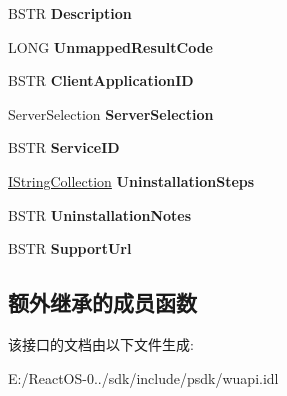 \begin{DoxyCompactItemize}
B\+S\+TR {\bfseries Description}
\item 
\mbox{\label{interface_w_u_api_lib_1_1_i_update_history_entry_af2b8fa931f60a9585f155c8e0131710d}} 
L\+O\+NG {\bfseries Unmapped\+Result\+Code}
\item 
\mbox{\label{interface_w_u_api_lib_1_1_i_update_history_entry_ab0ea8d94e8055c49b1fceab1669e60be}} 
B\+S\+TR {\bfseries Client\+Application\+ID}
\item 
\mbox{\label{interface_w_u_api_lib_1_1_i_update_history_entry_ad94595ec49f5157e1f8f99a7e8ed7e8f}} 
Server\+Selection {\bfseries Server\+Selection}
\item 
\mbox{\label{interface_w_u_api_lib_1_1_i_update_history_entry_a3e6ef802af2574e0091761ea0bdeb7bf}} 
B\+S\+TR {\bfseries Service\+ID}
\item 
\mbox{\label{interface_w_u_api_lib_1_1_i_update_history_entry_a901ee107a86ae0aedca9d586fec4b08c}} 
\hyperlink{interface_w_u_api_lib_1_1_i_string_collection}{I\+String\+Collection} {\bfseries Uninstallation\+Steps}
\item 
\mbox{\label{interface_w_u_api_lib_1_1_i_update_history_entry_a868fbdf93f4c12d48842a2c74af4be3d}} 
B\+S\+TR {\bfseries Uninstallation\+Notes}
\item 
\mbox{\label{interface_w_u_api_lib_1_1_i_update_history_entry_a071f0e65f4f0a9f743c7a1c35b487342}} 
B\+S\+TR {\bfseries Support\+Url}
\end{DoxyCompactItemize}
\subsection*{额外继承的成员函数}


该接口的文档由以下文件生成\+:\begin{DoxyCompactItemize}
\item 
E\+:/\+React\+O\+S-\/0../sdk/include/psdk/wuapi.\+idl\end{DoxyCompactItemize}
